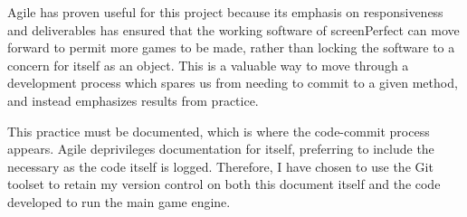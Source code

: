 Agile has proven useful for this project because its emphasis on responsiveness and deliverables has ensured that the working software of screenPerfect can move forward to permit more games to be made, rather than locking the software to a concern for itself as an object. This is a valuable way to move through a development process which spares us from needing to commit to a given method, and instead emphasizes results from practice.

This practice must be documented, which is where the code-commit process appears. Agile deprivileges documentation for itself, preferring to include the necessary as the code itself is logged. Therefore, I have chosen to use the Git toolset to retain my version control on both this document itself and the code developed to run the main game engine.